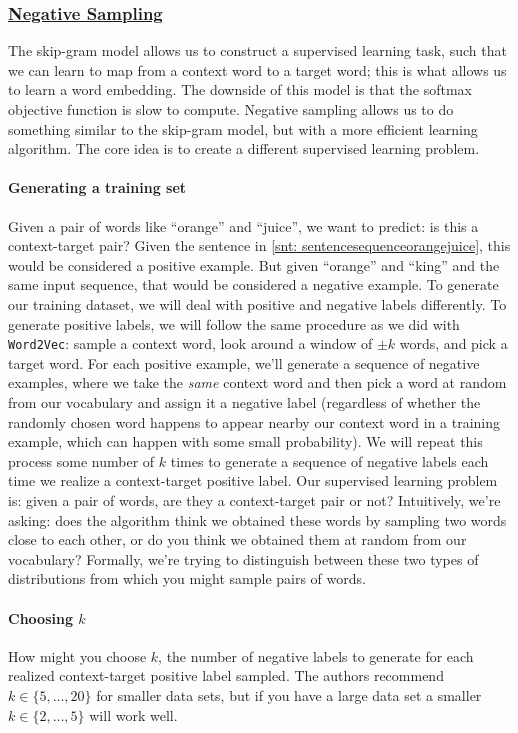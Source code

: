 \documentclass[12pt]{article}
\begin{document}
\subsubsection{\href{https://papers.nips.cc/paper/5021-distributed-representations-of-words-and-phrases-and-their-compositionality.pdf}{Negative Sampling}}
The skip-gram model allows us to construct a supervised learning task, such that we can learn to map from a context word to a target word; this is what allows us to learn a word embedding. The downside of this model is that the softmax objective function is slow to compute. Negative sampling allows us to do something similar to the skip-gram model, but with a more efficient learning algorithm. The core idea is to create a different supervised learning problem.

\paragraph{Generating a training set}
Given a pair of words like ``orange'' and ``juice'', we want to predict: is this a context-target pair? Given the sentence in \ref{snt: sentencesequenceorangejuice}, this would be considered a positive example. But given ``orange'' and ``king'' and the same input sequence, that would be considered a negative example. To generate our training dataset, we will deal with positive and negative labels differently. To generate positive labels, we will follow the same procedure as we did with \texttt{Word2Vec}: sample a context word, look around a window of $\pm k$ words, and pick a target word. For each positive example, we'll generate a sequence of negative examples, where we take the \emph{same} context word and then pick a word at random from our vocabulary and assign it a negative label (regardless of whether the randomly chosen word happens to appear nearby our context word in a training example, which can happen with some small probability). We will repeat this process some number of $k$ times to generate a sequence of negative labels each time we realize a context-target positive label. Our supervised learning problem is: given a pair of words, are they a context-target pair or not? Intuitively, we're asking: does the algorithm think we obtained these words by sampling two words close to each other, or do you think we obtained them at random from our vocabulary? Formally, we're trying to distinguish between these two types of distributions from which you might sample pairs of words.

\paragraph{Choosing $k$} How might you choose $k$, the number of negative labels to generate for each realized context-target positive label sampled. The authors recommend $k \in \{5, \ldots, 20\}$ for smaller data sets, but if you have a large data set a smaller $k \in \{2, \ldots, 5\}$ will work well.
\end{document}
